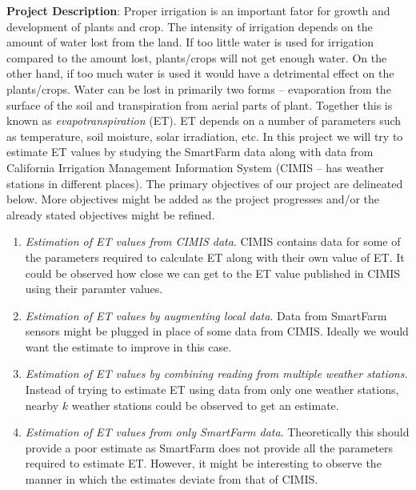 \documentclass[12pt]{article}
\begin{document}
\noindent
\textbf{Project Description}: Proper irrigation is an important fator for growth and development of plants and crop. The intensity of irrigation depends on the amount of water lost from the land. If too little water is used for irrigation compared to the amount lost, plants/crops will not get enough water. On the other hand, if too much water is used it would have a detrimental effect on the plants/crops. Water can be lost in primarily two forms -- evaporation from the surface of the soil and transpiration from aerial parts of plant. Together this is known as \textit{evapotranspiration} (ET). ET depends on a number of parameters such as temperature, soil moisture, solar irradiation, etc. In this project we will try to estimate ET values by studying the SmartFarm data along with data from California Irrigation Management Information System (CIMIS -- has weather stations in different places). The primary objectives of our project are delineated below. More objectives might be added as the project progresses and/or the already stated objectives might be refined.
\begin{enumerate}
	\item \textit{Estimation of ET values from CIMIS data}. CIMIS contains data for some of the parameters required to calculate ET along with their own value of ET. It could be observed how close we can get to the ET value published in CIMIS using their paramter values.
	\item \textit{Estimation of ET values by augmenting local data}. Data from SmartFarm sensors might be plugged in place of some data from CIMIS. Ideally we would want the estimate to improve in this case.
	\item \textit{Estimation of ET values by combining reading from multiple weather stations}. Instead of trying to estimate ET using data from only one weather stations, nearby $k$ weather stations could be observed to get an estimate.
	\item \textit{Estimation of ET values from only SmartFarm data}. Theoretically this should provide a poor estimate as SmartFarm does not provide all the parameters required to estimate ET. However, it might be interesting to observe the manner in which the estimates deviate from that of CIMIS.
\end{enumerate}
\end{document}

